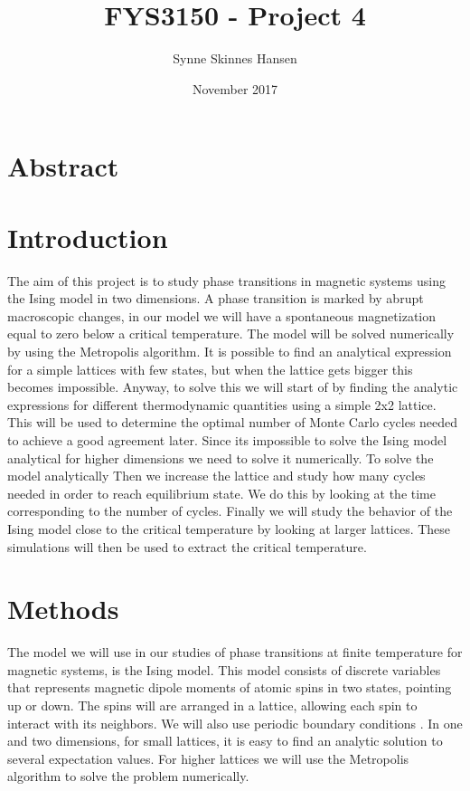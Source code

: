 \documentclass{article}
\title{FYS3150 - Project 4}
\author{Synne Skinnes Hansen}
\date{November 2017}
\begin{document}
\maketitle
\section*{Abstract}

\section*{Introduction}
The aim of this project is to study phase transitions in magnetic systems using the Ising model in two dimensions. A phase transition is marked by abrupt macroscopic changes, in our model we will have a spontaneous magnetization equal to zero below a critical temperature.
The model will be solved numerically by using the Metropolis algorithm. It is possible to find an analytical expression for a simple lattices with few states, but when the lattice gets bigger this becomes impossible. 
Anyway, to solve this we will start of by finding the analytic expressions for different thermodynamic quantities using a simple 2x2 lattice. This will be used to determine the optimal number of Monte Carlo cycles needed to achieve a good agreement later. 
Since its impossible to solve the Ising model analytical for higher dimensions we need to solve it numerically. 
To solve the model analytically 
Then we increase the lattice and study how many cycles needed in order to reach equilibrium state. We do this by looking at the time corresponding to the number of cycles.
Finally we will study the behavior of the Ising model close to the critical temperature by looking at larger lattices. These simulations will then be used to extract the critical temperature. 

\section*{Methods}
The model we will use in our studies of phase transitions at finite temperature for magnetic systems, is the Ising model. This model consists of discrete variables that represents magnetic dipole moments of atomic spins in two states, pointing up or down. The spins will are arranged in a lattice, allowing each spin to interact with its neighbors. We will also use periodic boundary conditions . 
In one and two dimensions, for small lattices, it is easy to find an analytic solution to several expectation values. For higher lattices we will use the Metropolis algorithm to solve the problem numerically. 
\end{document}
